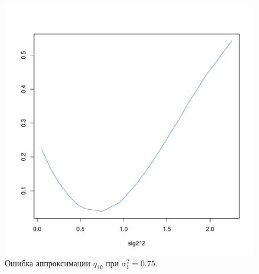 \documentclass[12pt]{article}
\begin{document}
\begin{figure}[!hhh]
	\begin{center}
		\begin{minipage}[h]{0.8\linewidth}
			\includegraphics[width=1\linewidth]{img/gr_neww_2.pdf}
			\caption{Ошибка аппроксимации $q_{10}$ при $\sigma_{1}^{2} = 0.75$.} %
			\label{ris8} %
		\end{minipage}	
	\end{center}
\end{figure}
\end{document}
